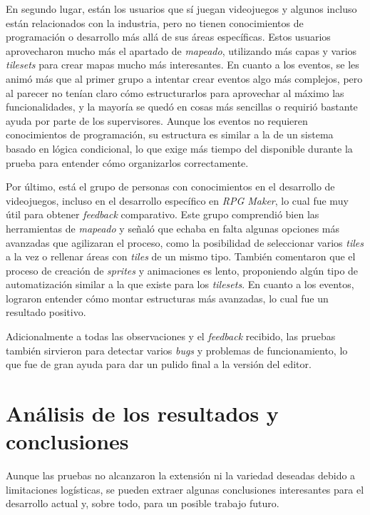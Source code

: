 \medskip

En segundo lugar, están los usuarios que sí juegan videojuegos y algunos incluso están relacionados con la industria, pero no tienen conocimientos de programación o desarrollo más allá de sus áreas específicas. Estos usuarios aprovecharon mucho más el apartado de \textit{mapeado}, utilizando más capas y varios \textit{tilesets} para crear mapas mucho más interesantes. En cuanto a los eventos, se les animó más que al primer grupo a intentar crear eventos algo más complejos, pero al parecer no tenían claro cómo estructurarlos para aprovechar al máximo las funcionalidades, y la mayoría se quedó en cosas más sencillas o requirió bastante ayuda por parte de los supervisores. Aunque los eventos no requieren conocimientos de programación, su estructura es similar a la de un sistema basado en lógica condicional, lo que exige más tiempo del disponible durante la prueba para entender cómo organizarlos correctamente.

\medskip

Por último, está el grupo de personas con conocimientos en el desarrollo de videojuegos, incluso en el desarrollo específico en \textit{RPG Maker}, lo cual fue muy útil para obtener \textit{feedback} comparativo. Este grupo comprendió bien las herramientas de \textit{mapeado} y señaló que echaba en falta algunas opciones más avanzadas que agilizaran el proceso, como la posibilidad de seleccionar varios \textit{tiles} a la vez o rellenar áreas con \textit{tiles} de un mismo tipo. También comentaron que el proceso de creación de \textit{sprites} y animaciones es lento, proponiendo algún tipo de automatización similar a la que existe para los \textit{tilesets}. En cuanto a los eventos, lograron entender cómo montar estructuras más avanzadas, lo cual fue un resultado positivo.

\medskip

Adicionalmente a todas las observaciones y el \textit{feedback} recibido, las pruebas también sirvieron para detectar varios \textit{bugs} y problemas de funcionamiento, lo que fue de gran ayuda para dar un pulido final a la versión del editor.

\section{Análisis de los resultados y conclusiones}
Aunque las pruebas no alcanzaron la extensión ni la variedad deseadas debido a limitaciones logísticas, se pueden extraer algunas conclusiones interesantes para el desarrollo actual y, sobre todo, para un posible trabajo futuro.


